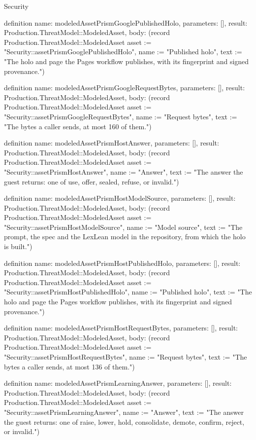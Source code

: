 \begin{lexlean}{Security}
\begin{semanticmodule}
definition{
  name: modeledAssetPrismGooglePublishedHolo,
  parameters: [],
  result: Production.ThreatModel::ModeledAsset,
  body: (record Production.ThreatModel::ModeledAsset {asset := "Security::assetPrismGooglePublishedHolo", name := "Published holo", text := "The holo and page the Pages workflow publishes, with its fingerprint and signed provenance."})
}

definition{
  name: modeledAssetPrismGoogleRequestBytes,
  parameters: [],
  result: Production.ThreatModel::ModeledAsset,
  body: (record Production.ThreatModel::ModeledAsset {asset := "Security::assetPrismGoogleRequestBytes", name := "Request bytes", text := "The bytes a caller sends, at most 160 of them."})
}

definition{
  name: modeledAssetPrismHostAnswer,
  parameters: [],
  result: Production.ThreatModel::ModeledAsset,
  body: (record Production.ThreatModel::ModeledAsset {asset := "Security::assetPrismHostAnswer", name := "Answer", text := "The answer the guest returns: one of use, offer, sealed, refuse, or invalid."})
}

definition{
  name: modeledAssetPrismHostModelSource,
  parameters: [],
  result: Production.ThreatModel::ModeledAsset,
  body: (record Production.ThreatModel::ModeledAsset {asset := "Security::assetPrismHostModelSource", name := "Model source", text := "The prompt, the spec and the LexLean model in the repository, from which the holo is built."})
}

definition{
  name: modeledAssetPrismHostPublishedHolo,
  parameters: [],
  result: Production.ThreatModel::ModeledAsset,
  body: (record Production.ThreatModel::ModeledAsset {asset := "Security::assetPrismHostPublishedHolo", name := "Published holo", text := "The holo and page the Pages workflow publishes, with its fingerprint and signed provenance."})
}

definition{
  name: modeledAssetPrismHostRequestBytes,
  parameters: [],
  result: Production.ThreatModel::ModeledAsset,
  body: (record Production.ThreatModel::ModeledAsset {asset := "Security::assetPrismHostRequestBytes", name := "Request bytes", text := "The bytes a caller sends, at most 136 of them."})
}

definition{
  name: modeledAssetPrismLearningAnswer,
  parameters: [],
  result: Production.ThreatModel::ModeledAsset,
  body: (record Production.ThreatModel::ModeledAsset {asset := "Security::assetPrismLearningAnswer", name := "Answer", text := "The answer the guest returns: one of raise, lower, hold, consolidate, demote, confirm, reject, or invalid."})
}


\end{semanticmodule}
\end{lexlean}
